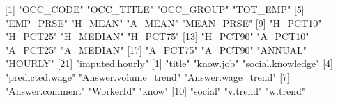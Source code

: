  [1] "OCC_CODE"       "OCC_TITLE"      "OCC_GROUP"      "TOT_EMP"       
 [5] "EMP_PRSE"       "H_MEAN"         "A_MEAN"         "MEAN_PRSE"     
 [9] "H_PCT10"        "H_PCT25"        "H_MEDIAN"       "H_PCT75"       
[13] "H_PCT90"        "A_PCT10"        "A_PCT25"        "A_MEDIAN"      
[17] "A_PCT75"        "A_PCT90"        "ANNUAL"         "HOURLY"        
[21] "imputed.hourly"
 [1] "title"               "know.job"            "social.knowledge"   
 [4] "predicted.wage"      "Answer.volume_trend" "Answer.wage_trend"  
 [7] "Answer.comment"      "WorkerId"            "know"               
[10] "social"              "v.trend"             "w.trend"            
